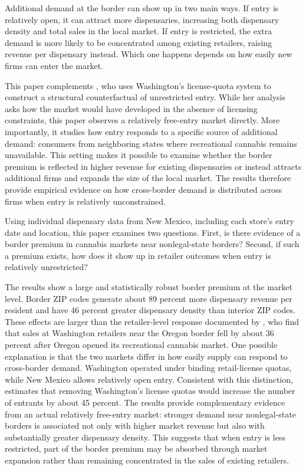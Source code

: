 \documentclass[12pt]{article}
\begin{document}
Additional demand at the border can show up in two main ways. If entry is relatively open, it can attract more dispensaries, increasing both dispensary density and total sales in the local market. If entry is restricted, the extra demand is more likely to be concentrated among existing retailers, raising revenue per dispensary instead. Which one happens depends on how easily new firms can enter the market.

This paper complements \cite{thomas2019license}, who uses Washington's license-quota system to construct a structural counterfactual of unrestricted entry. While her analysis asks how the market would have developed in the absence of licensing constraints, this paper observes a relatively free-entry market directly. More importantly, it studies how entry responds to a specific source of additional demand: consumers from neighboring states where recreational cannabis remains unavailable. This setting makes it possible to examine whether the border premium is reflected in higher revenue for existing dispensaries or instead attracts additional firms and expands the size of the local market. The results therefore provide empirical evidence on how cross-border demand is distributed across firms when entry is relatively unconstrained.


Using individual dispensary data from New Mexico, including each store’s entry date and location, this paper examines two questions. First, is there evidence of a border premium in cannabis markets near nonlegal-state borders? Second, if such a premium exists, how does it show up in retailer outcomes when entry is relatively unrestricted?


The results show a large and statistically robust border premium at the market level. Border ZIP codes generate about 89 percent more dispensary revenue per resident and have 46 percent greater dispensary density than interior ZIP codes. These effects are larger than the retailer-level response documented by \cite{HansenMillerWeber2020}, who find that sales at Washington retailers near the Oregon border fell by about 36 percent after Oregon opened its recreational cannabis market. One possible explanation is that the two markets differ in how easily supply can respond to cross-border demand. Washington operated under binding retail-license quotas, while New Mexico allows relatively open entry. Consistent with this distinction, \cite{thomas2019license} estimates that removing Washington's license quotas would increase the number of entrants by about 45 percent. The results provide complementary evidence from an actual relatively free-entry market: stronger demand near nonlegal-state borders is associated not only with higher market revenue but also with substantially greater dispensary density. This suggests that when entry is less restricted, part of the border premium may be absorbed through market expansion rather than remaining concentrated in the sales of existing retailers.
\end{document}
